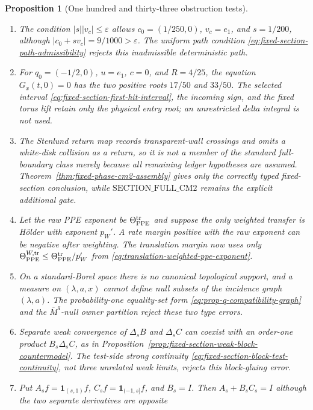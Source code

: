\documentclass[11pt]{article}
\newtheorem{proposition}[theorem]{Proposition}
\newcommand{\one}{\mathbf 1}
\begin{document}
\begin{proposition}[One hundred and thirty-three obstruction tests]
\begin{enumerate}[label=\textup{(T\arabic*)}]
      \textup{(H3)}, rejects this clock-concentration countermodel.
\item The condition $|s||v_c|\le\varepsilon$ allows
      $c_0=(1/250,0)$, $v_c=e_1$, and $s=1/200$, although
      $|c_0+sv_c|=9/1000>\varepsilon$.  The uniform path condition
      \eqref{eq:fixed-section-path-admissibility} rejects this inadmissible
      deterministic path.
\item For $q_0=(-1/2,0)$, $u=e_1$, $c=0$, and $R=4/25$, the equation
      $G_x(t,0)=0$ has the two positive roots $17/50$ and $33/50$.
      The selected interval \eqref{eq:fixed-section-first-hit-interval}, the
      incoming sign, and the fixed torus lift retain only the physical entry
      root; an unrestricted delta integral is not used.
\item The Stenlund return map records transparent-wall crossings and omits a
      white-disk collision as a return, so it is not a member of the standard
      full-boundary class merely because all remaining ledger hypotheses are
      assumed.  Theorem~\ref{thm:fixed-phase-cm2-assembly} gives only the
      correctly typed fixed-section conclusion, while
      $\mathrm{SECTION\_FULL\_CM2}$ remains the explicit additional gate.
\item Let the raw PPE exponent be $\Theta_{\rm PPE}^{\rm tr}$ and suppose the
      only weighted transfer is H\"older with exponent $p_W'$.  A rate margin
      positive with the raw exponent can be negative after weighting.  The
      translation margin now uses only
      $\Theta_{\rm PPE}^{W,\rm tr}\le
      \Theta_{\rm PPE}^{\rm tr}/p_W'$ from
      \eqref{eq:translation-weighted-ppe-exponent}.
\item On a standard-Borel space there is no canonical topological support,
      and a measure on $(\lambda,a,x)$ cannot define null subsets of the
      incidence graph $(\lambda,a)$.  The probability-one equality-set form
      \eqref{eq:prop-q-compatibility-graph} and the
      $\overline M^q$-null owner partition reject these two type errors.
\item Separate weak convergence of $\Delta_sB$ and $\Delta_sC$ can coexist
      with an order-one product $B_s\Delta_sC$, as in
      Proposition~\ref{prop:fixed-section-weak-block-countermodel}.  The
      test-side strong continuity
      \eqref{eq:fixed-section-block-test-continuity}, not three unrelated
      weak limits, rejects this block-gluing error.
\item Put $A_sf=\one_{(s,1)}f$, $C_sf=\one_{(-1,s]}f$, and $B_s=I$.  Then
      $A_s+B_sC_s=I$ although the two separate derivatives are opposite

\end{enumerate}
\end{proposition}
\end{document}
